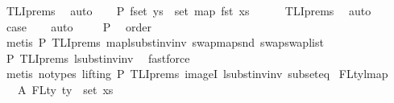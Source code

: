 \begin{isabellebody}
\ TLI{\isachardot}{\kern0pt}prems{\isacharparenleft}{\kern0pt}{}{\isacharparenright}{\kern0pt}\ \isamarkupfalse%
\ auto\isanewline
\isanewline
\ \ \isamarkupfalse%
\ P{}{\isacharcolon}{\kern0pt}\ {\isachardoublequoteopen}fset\ ys\ {\isasymsubseteq}\ set\ {\isacharparenleft}{\kern0pt}map\ fst\ xs{\isacharparenright}{\kern0pt}{\isachardoublequoteclose}\isanewline
\ \ \ \ \isamarkupfalse%
\ TLI{\isachardot}{\kern0pt}prems{\isacharparenleft}{\kern0pt}{}{\isacharparenright}{\kern0pt}\ \isamarkupfalse%
\ auto\isanewline
\isanewline
\ \ \isamarkupfalse%
\ {\isacharquery}{\kern0pt}case\isanewline
\ \ \isamarkupfalse%
\ auto\isanewline
\ \ \ \isamarkupfalse%
\ P{}\ \isamarkupfalse%
\ order\isanewline
\ \ \isamarkupfalse%
\ {\isacharparenleft}{\kern0pt}metis\ P{}\ TLI{\isachardot}{\kern0pt}prems{\isacharparenleft}{\kern0pt}{}{\isacharparenright}{\kern0pt}\ map{\isacharunderscore}{\kern0pt}lsubst{\isacharunderscore}{\kern0pt}inv{\isacharunderscore}{\kern0pt}inv\ swap{\isacharunderscore}{\kern0pt}map{\isacharunderscore}{\kern0pt}snd\ swap{\isacharunderscore}{\kern0pt}swap{\isacharunderscore}{\kern0pt}list{\isacharparenright}{\kern0pt}\isanewline
\ \ \isamarkupfalse%
\ P{}\ TLI{\isachardot}{\kern0pt}prems{\isacharparenleft}{\kern0pt}{}{\isacharparenright}{\kern0pt}\ lsubst{\isacharunderscore}{\kern0pt}inv{\isacharunderscore}{\kern0pt}inv{}\ \isamarkupfalse%
\ fastforce\isanewline
\ \ \isamarkupfalse%
\ {\isacharparenleft}{\kern0pt}metis\ {\isacharparenleft}{\kern0pt}no{\isacharunderscore}{\kern0pt}types{\isacharcomma}{\kern0pt}\ lifting{\isacharparenright}{\kern0pt}\ P{}\ TLI{\isachardot}{\kern0pt}prems{\isacharparenleft}{\kern0pt}{}{\isacharparenright}{\kern0pt}\ imageI\ lsubst{\isacharunderscore}{\kern0pt}inv{\isacharunderscore}{\kern0pt}inv{}\ subset{\isacharunderscore}{\kern0pt}eq{\isacharparenright}{\kern0pt}\isanewline
{}\isamarkupfalse%
%
\endisatagproof
{\isafoldproof}%
%
\isadelimproof
\isanewline
%
\endisadelimproof
\isanewline
\isanewline
\isanewline
\isanewline
\isanewline
\isanewline
{}\isamarkupfalse%
\ FL{\isacharunderscore}{\kern0pt}ty{\isacharunderscore}{\kern0pt}lmap{\isacharcolon}{\kern0pt}\isanewline
\ \ \ A{}{\isacharcolon}{\kern0pt}\ {\isachardoublequoteopen}FLty\ ty\ {\isacharequal}{\kern0pt}\ set\ xs{\isachardoublequoteclose}\isanewline

\end{isabellebody}
